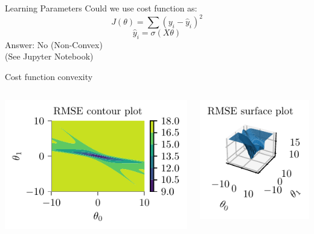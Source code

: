 \documentclass{beamer}
\begin{document}
\begin{frame}{Learning Parameters}
Could we use cost function as:
\begin{equation*}
J(\theta) = \sum (y_{i} - \hat{y}_{i})^{2}
\end{equation*}
\begin{equation*}
\hat{y}_{i} = \sigma(X\theta)
\end{equation*}
Answer: No (Non-Convex) \\ \hspace{1.2cm} (See Jupyter Notebook)
\end{frame}


\begin{frame}{Cost function convexity}
\begin{columns}
	\begin{column}{0.5\textwidth}
		\includegraphics[scale=0.7]{../figures/logistic-regression/logistic-sse-loss-contour.pdf}
	\end{column}
\begin{column}{0.5\textwidth}
	\includegraphics[scale=0.7]{../figures/logistic-regression/logistic-sse-loss-3d.pdf}
\end{column}
\end{columns}
\end{frame}
\end{document}
